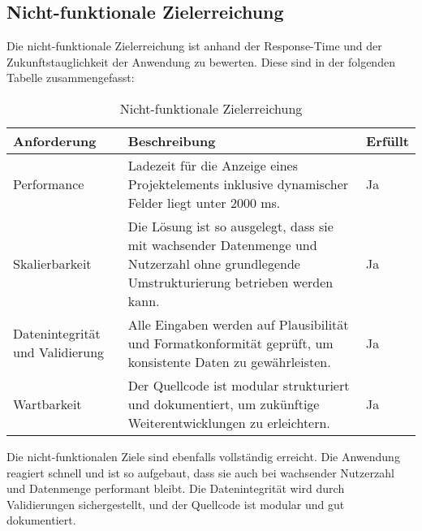 \subsection{Nicht-funktionale Zielerreichung}
Die nicht-funktionale Zielerreichung ist anhand der Response-Time und der Zukunftstauglichkeit der Anwendung zu bewerten. Diese sind in der folgenden Tabelle zusammengefasst:
\begin{table}[H]
    \centering
    \caption{Nicht-funktionale Zielerreichung}
    \label{tab:nichtfunktionaleZielerreichung}
    \begin{tabular}{|p{}|p{}|p{}|}
        \hline
        \textbf{Anforderung} & \textbf{Beschreibung} & \textbf{Erfüllt} \\ \hline
        Performance & Ladezeit für die Anzeige eines Projektelements inklusive dynamischer Felder liegt unter 2000 ms. & Ja \\ \hline
        Skalierbarkeit & Die Lösung ist so ausgelegt, dass sie mit wachsender Datenmenge und Nutzerzahl ohne grundlegende Umstrukturierung betrieben werden kann. & Ja \\ \hline
        Datenintegrität und Validierung & Alle Eingaben werden auf Plausibilität und Formatkonformität geprüft, um konsistente Daten zu gewährleisten. & Ja \\ \hline
        Wartbarkeit & Der Quellcode ist modular strukturiert und dokumentiert, um zukünftige Weiterentwicklungen zu erleichtern. & Ja \\ \hline
    \end{tabular}
\end{table}
Die nicht-funktionalen Ziele sind ebenfalls vollständig erreicht. Die Anwendung reagiert schnell und ist so aufgebaut, dass sie auch bei wachsender Nutzerzahl und Datenmenge performant bleibt. Die Datenintegrität wird durch Validierungen sichergestellt, und der Quellcode ist modular und gut dokumentiert.
